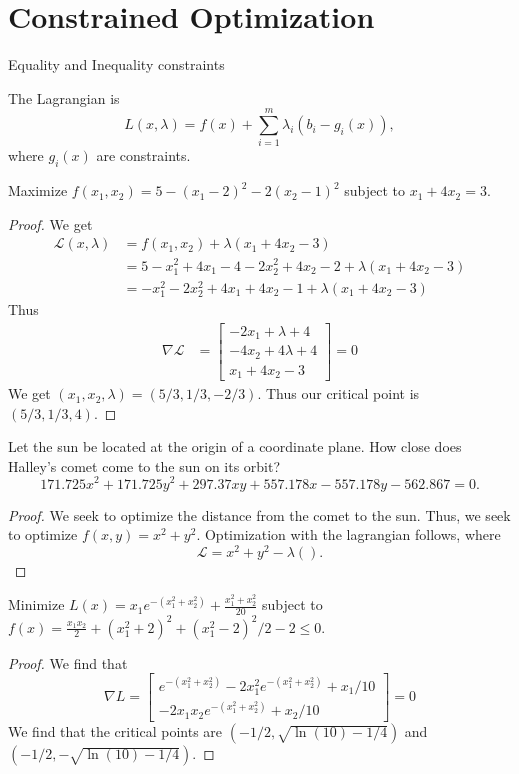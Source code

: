 \section{Constrained Optimization}
Equality and Inequality constraints
\begin{definition}
    The \alert{Lagrangian} is
    $$L(x,\lambda) = f(x) + \sum_{i=1}^{m} \lambda_i (b_i-g_i(x)),$$
    where $g_i(x)$ are constraints. 
\end{definition}
\begin{example}
    Maximize $f(x_1,x_2)=5-(x_1-2)^2-2(x_2-1)^2$ subject to $x_1+4x_2=3$. 
\end{example}
\begin{proof}
    We get
    \begin{align*}
        \mathcal{L}(x,\lambda) &= f(x_1,x_2) +\lambda(x_1+4x_2-3) \\
          &= 5-x_1^2+4x_1-4-2x_2^2+4x_2-2 +\lambda(x_1+4x_2-3)\\
          &=-x_1^2-2x_2^2+4x_1+4x_2-1+\lambda(x_1+4x_2-3)
    \end{align*}
    Thus
    \begin{align*}
        \nabla \mathcal{L} &= \begin{bmatrix} -2x_1+\lambda+4 \\ -4x_2+4\lambda+4 \\ x_1+4x_2-3\end{bmatrix}=0
    \end{align*}
    We get $(x_1,x_2,\lambda) = (5/3, 1/3,-2/3)$. Thus our critical point is
    $\boxed{(5/3, 1/3, 4)}.$
\end{proof}
\begin{example}
    Let the sun be located at the origin of a coordinate plane. How close
    does Halley's comet come to the sun on its orbit?
    $$171.725x^2+171.725y^2+297.37xy+557.178x-557.178y-562.867=0.$$
\end{example}
\begin{proof}
    We seek to optimize the distance from the comet to the sun. Thus,
    we seek to optimize $f(x,y)=x^2+y^2$. Optimization with the lagrangian
    follows, where
    $$\mathcal{L} = x^2+y^2-\lambda().$$
\end{proof}
\begin{example}
    Minimize $L(x)=x_1e^{-(x_1^2+x_2^2)}+\frac{x_1^2+x_2^2}{20}$ subject to 
    $f(x) = \frac{x_1x_2}{2}+(x_1^2+2)^2+(x_1^2-2)^2/2-2\leq 0$.
\end{example}
\begin{proof}
    We find that
    $$\nabla L = 
    \begin{bmatrix} e^{-(x_1^2+x_2^2)}-2x_1^2e^{-(x_1^2+x_2^2)} +x_1/10\\ 
    -2x_1x_2e^{-(x_1^2+x_2^2)}+x_2/10 \end{bmatrix}=0$$
    We find that the critical points are $(-1/2,\sqrt{\ln(10)-1/4})$ and
    $(-1/2,-\sqrt{\ln(10)-1/4})$.
\end{proof}

